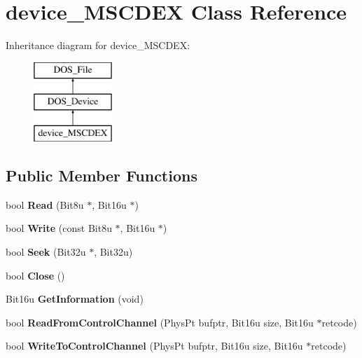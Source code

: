 \hypertarget{classdevice__MSCDEX}{\section{device\-\_\-\-M\-S\-C\-D\-E\-X Class Reference}
\label{classdevice__MSCDEX}
}
Inheritance diagram for device\-\_\-\-M\-S\-C\-D\-E\-X\-:\begin{figure}[H]
\begin{center}
\leavevmode
\includegraphics[height=3.000000cm]{classdevice__MSCDEX}
\end{center}
\end{figure}
\subsection*{Public Member Functions}
\begin{DoxyCompactItemize}
\item 
\hypertarget{classdevice__MSCDEX_a040e9958dfe8006f4db405f7054cbc80}{bool {\bfseries Read} (Bit8u $\ast$, Bit16u $\ast$)}\label{classdevice__MSCDEX_a040e9958dfe8006f4db405f7054cbc80}

\item 
\hypertarget{classdevice__MSCDEX_a5ba92cc217e36db4e3ec5ba6501b8351}{bool {\bfseries Write} (const Bit8u $\ast$, Bit16u $\ast$)}\label{classdevice__MSCDEX_a5ba92cc217e36db4e3ec5ba6501b8351}

\item 
\hypertarget{classdevice__MSCDEX_a5d079fd4f68950089005e9bd4baf4443}{bool {\bfseries Seek} (Bit32u $\ast$, Bit32u)}\label{classdevice__MSCDEX_a5d079fd4f68950089005e9bd4baf4443}

\item 
\hypertarget{classdevice__MSCDEX_a8cd5c384e7228e66c22096688fc32f9a}{bool {\bfseries Close} ()}\label{classdevice__MSCDEX_a8cd5c384e7228e66c22096688fc32f9a}

\item 
\hypertarget{classdevice__MSCDEX_afe06caa1a1cf0cd5d9ac729a01d8d15f}{Bit16u {\bfseries Get\-Information} (void)}\label{classdevice__MSCDEX_afe06caa1a1cf0cd5d9ac729a01d8d15f}

\item 
\hypertarget{classdevice__MSCDEX_ac43fd2bd4529e0c8040a5ee56a9a855b}{bool {\bfseries Read\-From\-Control\-Channel} (Phys\-Pt bufptr, Bit16u size, Bit16u $\ast$retcode)}\label{classdevice__MSCDEX_ac43fd2bd4529e0c8040a5ee56a9a855b}

\item 
\hypertarget{classdevice__MSCDEX_a6ce13a07ecc864730388a972a20e9d81}{bool {\bfseries Write\-To\-Control\-Channel} (Phys\-Pt bufptr, Bit16u size, Bit16u $\ast$retcode)}\label{classdevice__MSCDEX_a6ce13a07ecc864730388a972a20e9d81}

\end{DoxyCompactItemize}


